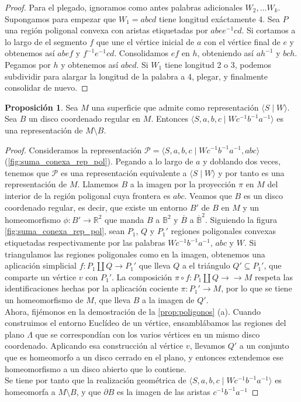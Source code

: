 \documentclass[10pt]{report}
\newcommand{\R}{\mathbb{R}}
\theoremstyle{definition}
\newtheorem{prop}[defin]{Proposición}
\begin{document}
\begin{proof}
Para el plegado, ignoramos como antes palabras adicionales $W_2,\dots W_k$. Supongamos para empezar que $W_1=abcd$ tiene longitud exáctamente 4. Sea $P$ una región poligonal convexa con aristas etiquetadas por $abee^{-1}cd$. Si cortamos a lo largo de el segmento $f$ que une el vértice inicial de $a$ con el vértice final de $e$ y obtenemos así $abef$ y $f^{-1}e^{-1}cd$. Consolidamos $ef$ en $h$, obteniendo así $ah^{-1}$ y $bch$. Pegamos por $h$ y obtenemos así $abcd$.
Si $W_1$ tiene longitud 2 o 3, podemos subdividir para alargar la longitud de la palabra a 4, plegar, y finalmente consolidar de nuevo.
\end{proof}

\begin{prop}\label{prop:rep_perf}
Sea $M$ una superficie que admite como representación $\langle S\mid W\rangle$. Sea $B$ un disco coordenado regular en $M$. Entonces $\langle S,a,b,c\mid Wc^{-1}b^{-1}a^{-1}\rangle$ es una representación de $M\setminus B$.
\end{prop}
\begin{proof}
Consideramos la representación $\mathcal{P}=\langle S,a,b,c\mid Wc^{-1}b^{-1}a^{-1},abc\rangle$ (\autoref{fig:suma_conexa_rep_pol}). Pegando a lo largo de $a$ y doblando dos veces, tenemos que $\mathcal{P}$ es una representación equivalente a $\langle S\mid W\rangle$ y por tanto es una representación de $M$. Llamemos $B$ a la imagen por la proyección $\pi$ en $M$ del interior de la región poligonal cuya frontera es $abc$. Veamos que $B$ es un disco coordenado regular, es decir, que existe un entorno $B'$ de $B$ en $M$ y un homeomorfismo $\phi :B'\to \R^2$ que manda $B$ a $\mathbb{B}^2$ y $\overline{B}$ a $\overline{\mathbb{B}}^2$. Siguiendo la figura \autoref{fig:suma_conexa_rep_pol}, sean $P_1$, $Q$ y $P_1'$ regiones poligonales convexas etiquetadas respectivamente por las palabras $Wc^{-1}b^{-1}a^{-1}$, $abc$ y $W$. Si triangulamos las regiones poligonales como en la  imagen, obtenemos una aplicación simplicial $f:P_1\amalg Q\to P_1'$ que lleva $Q$ a el triángulo $Q'\subseteq P_1'$, que comparte un vértice $v$ con $P_1'$. La composición $\pi \circ f: P_1\amalg Q\to \to M$ respeta las identificaciones hechas por la aplicación cociente $\pi :P_1'\to M$, por lo que se tiene un homeomorfismo de $M$, que lleva $B$ a la imagen de $Q'$.\\
Ahora, fijémonos en la demostración de la \autoref{prop:poligonos} (a). Cuando construimos el entorno Euclídeo de un vértice, ensamblábamos las regiones del plano $\Lambda$ que se correspondían con los varios vértices en un mismo disco coordenado. Aplicando esa construcción al vértice $v$, llevamos $Q'$ a un conjunto que es homeomorfo a un disco cerrado en el plano, y  entonces extendemos ese homeomorfismo a un disco abierto que lo contiene.\\
Se tiene por tanto que la realización geométrica de $\langle S,a,b,c\mid Wc^{-1}b^{-1}a^{-1}\rangle$ es homeomorfa a $M\setminus B$, y que $\partial B$ es la imagen de las aristas $c^{-1}b^{-1}a^{-1}$
\end{proof}
\end{document}
